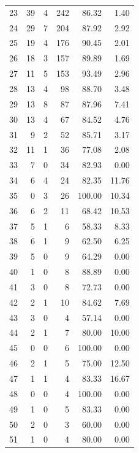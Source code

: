 \documentclass[11pt]{article}
\begin{document}
\begin{longtable}{r|r|r|r|r|r}
    23    & 39    & 4     & 242   & 86.32 & 1.40 \\
    24    & 29    & 7     & 204   & 87.92 & 2.92 \\
    25    & 19    & 4     & 176   & 90.45 & 2.01 \\
    26    & 18    & 3     & 157   & 89.89 & 1.69 \\
    27    & 11    & 5     & 153   & 93.49 & 2.96 \\
    28    & 13    & 4     & 98    & 88.70 & 3.48 \\
    29    & 13    & 8     & 87    & 87.96 & 7.41 \\
    30    & 13    & 4     & 67    & 84.52 & 4.76 \\
    31    & 9     & 2     & 52    & 85.71 & 3.17 \\
    32    & 11    & 1     & 36    & 77.08 & 2.08 \\
    33    & 7     & 0     & 34    & 82.93 & 0.00 \\
    34    & 6     & 4     & 24    & 82.35 & 11.76 \\
    35    & 0     & 3     & 26    & 100.00 & 10.34 \\
    36    & 6     & 2     & 11    & 68.42 & 10.53 \\
    37    & 5     & 1     & 6     & 58.33 & 8.33 \\
    38    & 6     & 1     & 9     & 62.50 & 6.25 \\
    39    & 5     & 0     & 9     & 64.29 & 0.00 \\
    40    & 1     & 0     & 8     & 88.89 & 0.00 \\
    41    & 3     & 0     & 8     & 72.73 & 0.00 \\
    42    & 2     & 1     & 10    & 84.62 & 7.69 \\
    43    & 3     & 0     & 4     & 57.14 & 0.00 \\
    44    & 2     & 1     & 7     & 80.00 & 10.00 \\
    45    & 0     & 0     & 6     & 100.00 & 0.00 \\
    46    & 2     & 1     & 5     & 75.00 & 12.50 \\
    47    & 1     & 1     & 4     & 83.33 & 16.67 \\
    48    & 0     & 0     & 4     & 100.00 & 0.00 \\
    49    & 1     & 0     & 5     & 83.33 & 0.00\\
    50    & 2     & 0     & 3     & 60.00 & 0.00\\
    51    & 1     & 0     & 4     & 80.00 & 0.00\\

\end{longtable}
\end{document}
